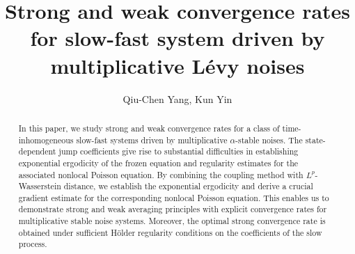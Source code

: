 \documentclass[11pt,reqno]{amsart}
\numberwithin{equation}{section}
\begin{document}
	
\allowdisplaybreaks
\title[convergence rates for slow-fast system]{Strong and weak convergence rates for slow-fast system driven by   multiplicative L\'{e}vy noises}

\author{Qiu-Chen Yang, Kun Yin}

\address{\textbf{Qiu-Chen Yang:} School of Mathematical Sciences, Shanghai Jiao Tong University, 200240 Shanghai, PR China.}


\address{\textbf{Kun Yin:} School of Mathematical Sciences, Shanghai Jiao Tong University, 200240 Shanghai, PR China.}










\allowdisplaybreaks



\begin{abstract}
In this paper, we study strong and weak convergence rates for a class of time-inhomogeneous slow-fast systems driven by multiplicative $\alpha$-stable noises. The state-dependent jump coefficients give rise to substantial difficulties in establishing exponential ergodicity of the frozen equation and regularity estimates for the associated nonlocal Poisson equation. By combining the coupling method with $L^p$-Wasserstein distance, we establish the exponential ergodicity and derive a crucial gradient estimate for the corresponding nonlocal Poisson equation. This enables us to demonstrate strong and weak averaging principles with explicit convergence rates for multiplicative stable noise systems. Moreover, the optimal strong convergence rate is obtained under sufficient H\"older regularity conditions on the coefficients of the slow process.
\end{abstract}

\maketitle


\end{document}
